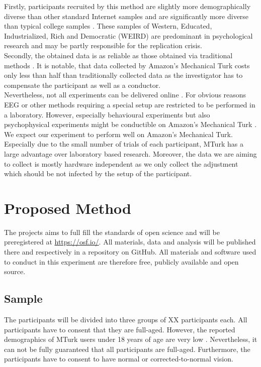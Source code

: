 \documentclass[a4paper, doc, draftall]{apa6}
\begin{document}
Firstly, participants recruited by this method are slightly more demographically diverse than other standard Internet samples and are significantly more diverse than typical college samples \parencite{buhrmeister2011}. These samples of Western, Educated, Industrialized, Rich and Democratic (WEIRD) are predominant in psychological research and may be partly responsible for the replication crisis.\\ %
Secondly, the obtained data is as reliable as those obtained via traditional methods \parencite{Hilbig2016, deLeeuw2016, paolacci2010}. It is notable, that data collected by Amazon's Mechanical Turk costs only less than half than traditionally collected data as the investigator has to compensate the participant as well as a conductor.\\
Nevertheless, not all experiments can be delivered online \parencite{gosling2010advanced}. For obvious reasons EEG or other methods requiring a special setup are restricted to be performed in a laboratory. However, especially behavioural experiments but also psychophysical experiments might be conductible on Amazon's Mechanical Turk \parencite{Mason2012, paolacci2010}.\\
We expect our experiment to perform well on Amazon's Mechanical Turk. Especially due to the small number of trials of each participant, MTurk has a large advantage over laboratory based research. Moreover, the data we are aiming to collect is mostly hardware independent as we only collect the adjustment which should be not infected by the setup of the participant. 

\section{Proposed Method}
	The projects aims to full fill the standards of open science and will be preregistered at \url{https://osf.io/}. All materials, data and analysis will be published there and respectively in a repository on GitHub. All materials and software used to conduct in this experiment are therefore free, publicly available and open source.
	
	\subsection{Sample}
		The participants will be divided into three groups of XX participants each. All participants have to consent that they are full-aged. However, the reported demographics of MTurk users under 18 years of age are very low \parencite{Mason2012}. Nevertheless, it can not be fully guaranteed that all participants are full-aged. Furthermore, the participants have to consent to have normal or corrected-to-normal vision.
		
\end{document}
